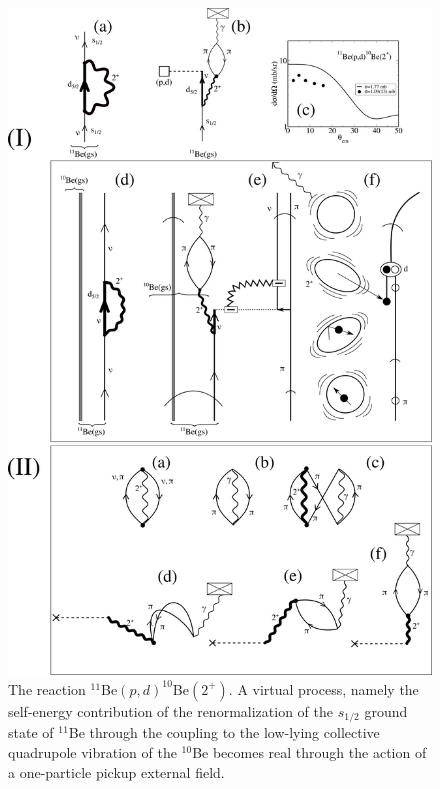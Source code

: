   \begin{figure}
  \centerline{\includegraphics*[width=14cm,angle=0]{C8/figsC8/Fig3}}
  	\caption{The reaction $^{11}$Be$(p,d)^{10}$Be$(2^+)$. A virtual process, namely the self-energy contribution of the renormalization of the $s_{1/2}$ ground state of $^{11}$Be through the coupling to the low-lying collective quadrupole vibration of the $^{10}$Be becomes real through the action of a one-particle pickup external field.}\label{fig6.6.2}
  \end{figure}
  
 
